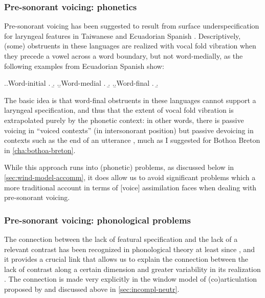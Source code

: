 \subsubsection{Pre-sonorant voicing: phonetics}
\label{sec:pre-sonor-voic}

Pre-sonorant voicing has been suggested to result from surface underspecification for laryngeal features in Taiwanese \citep{hsu98:_voicin_taiwan} and Ecuadorian Spanish \citep{colina09:_sibil_ecuad_spanis}. Descriptively, (some) obstruents in these languages are realized with vocal fold vibration when they precede a vowel across a word boundary, but not word-medially, as the following examples from Ecuadorian Spanish \citep[\egm][]{robinson79:_ecuad,lipski89:_s_voicin_ecuad_spanis} show:

\ex.\a.Word-initial
\a.
\b.
\z.\b.Word-medial
\a.
\b.
\z.\b.Word-final
\a.
\b.


The basic idea is that word-final obstruents in these languages cannot support a laryngeal specification, and thus that the extent of vocal fold vibration is extrapolated purely by the phonetic context: in other words, there is passive voicing in \enquote{voiced contexts} (\eg in intersonorant position) but passive devoicing in contexts such as the end of an utterance \citep[\egm][]{jansen04:_laryn}, much as I suggested for Bothoa Breton in \cref{cha:bothoa-breton}.

While this approach runs into (phonetic) problems, as discussed below in \cref{sec:wind-model-accomm}, it does allow us to avoid significant problems which a more traditional account in terms of [voice] assimilation faces when dealing with pre-sonorant voicing.

\subsubsection{Pre-sonorant voicing: phonological problems}
\label{sec:pre-sonorant-voicing}

The connection between the lack of featural specification and the lack of a relevant contrast has been recognized in phonological theory at least since \citet{Tru39}, and it provides a crucial link that allows us to explain the connection between the lack of contrast along a certain dimension and greater variability in its realization \citep[\egm][]{dyck}. The connection is made very explicitly in the window model of (co)articulation proposed by \citet{keating88,keating90} and discussed above in \cref{sec:incompl-neutr}.

